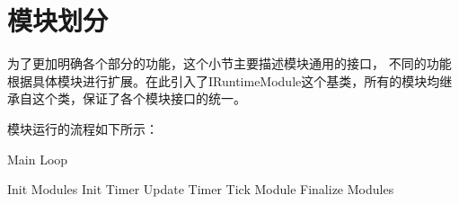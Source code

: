 \section{模块划分}

为了更加明确各个部分的功能，这个小节主要描述模块通用的接口，
不同的功能根据具体模块进行扩展。在此引入了IRuntimeModule这个基类，所有的模块均继承自这个类，保证了各个模块接口的统一。



模块运行的流程如下所示：

\begin{breakablealgorithm}
\caption{Main Loop}
\label{mainloop function}
\begin{algorithmic}
    \State Init Modules
    \State Init Timer
        \State Update Timer
        \State Tick Module
    \EndWhile
    \State Finalize Modules
\EndProcedure
\end{algorithmic}
\end{breakablealgorithm}
